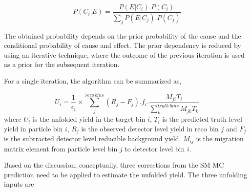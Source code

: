\begin{equation}
P(C_{i}|E) = \frac{ P(E|C_{i}) . P(C_{i}) } { \sum_{j}{ P(E|C_{j}).P(C_{j}) } }
\label{eqn:BayesTheorem}
\end{equation}

The obtained probability depends on the prior probability of the cause and the conditional probability of cause and effect. The prior dependency is reduced by using an iterative technique, where the outcome of the previous iteration is used as a prior for the subsequent iteration.

For a single iteration, the algorithm can be summarized as, 

\begin{equation}
    U_{i} = \frac{1}{ \epsilon_{i} } \times \sum^{reco~bins}_{j}{ (R_j -F_j ) . f_{i} . \frac{M_{ji} T_{i}}{ \sum_{k}^{truth~bins}{M_{jk} T_{k}}} } 
    \label{eqn:BayesianUnfolding}
\end{equation}
where $U_{i}$ is the unfolded yield in the target bin $i$, $T_{i}$ is the predicted truth level yield in particle bin $i$, $R_{j}$ is the observed detector level yield in reco bin $j$ and $F_{j}$ is the subtracted detector level reducible background yield. $M_{ij}$ is the migration matrix element from particle level bin $j$ to detector level bin $i$. 

Based on the discussion, conceptually, three corrections from the SM MC prediction need to be applied to estimate the unfolded yield. The three unfolding inputs are 

